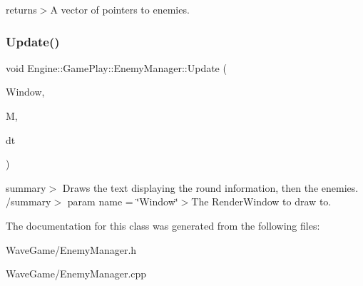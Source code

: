 returns$>$A vector of pointers to enemies.\mbox{\label{class_engine_1_1_game_play_1_1_enemy_manager_a545df3d86d86905d5db1e4bb8f327137}} 
\subsubsection{\texorpdfstring{Update()}{Update()}}
{\footnotesize\ttfamily void Engine\+::\+Game\+Play\+::\+Enemy\+Manager\+::\+Update (\begin{DoxyParamCaption}\item[{Render\+Window $\ast$}]{Window,  }\item[{\hyperlink{class_engine_1_1_core_1_1_map}{Map}}]{M,  }\item[{float}]{dt }\end{DoxyParamCaption})}

summary$>$ Draws the text displaying the round information, then the enemies. /summary$>$ param name = \char`\"{}\+Window\char`\"{}$>$The Render\+Window to draw to.

The documentation for this class was generated from the following files\+:\begin{DoxyCompactItemize}
\item 
Wave\+Game/Enemy\+Manager.\+h\item 
Wave\+Game/Enemy\+Manager.\+cpp\end{DoxyCompactItemize}
